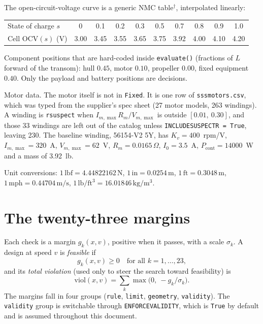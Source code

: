 \documentclass[11pt,a4paper]{article}
\renewcommand{\_}{\textunderscore\allowbreak}
\newcommand{\code}[1]{\texttt{#1}}
\begin{document}
The open-circuit-voltage curve is a generic NMC table$^\dagger$, interpolated linearly:
\begin{center}\small
\begin{tabular}{@{}l *{9}{c}@{}}
\toprule
State of charge $s$ & 0 & 0.1 & 0.2 & 0.3 & 0.5 & 0.7 & 0.8 & 0.9 & 1.0 \\
Cell $\mathrm{OCV}(s)$ (V) & 3.00 & 3.45 & 3.55 & 3.65 & 3.75 & 3.92 & 4.00 & 4.10 & 4.20 \\
\bottomrule
\end{tabular}
\end{center}

Component positions that are hard-coded inside \code{evaluate()} (fractions of $L$ forward of the transom):
hull $0.45$, motor $0.10$, propeller $0.00$, fixed equipment $0.40$. Only the payload and battery positions are decisions.

Motor data. The motor itself is not in \code{Fixed}. It is one row of \code{sss\_motors.csv}, which was typed from the supplier's spec sheet (27 motor models, 263 windings). A winding is \code{r\_suspect} when $I_{m,\max}R_m/V_{m,\max}$ is outside $[0.01,\ 0.30]$, and those 33 windings are left out of the catalog unless \code{INCLUDE\_SUSPECT\_R = True}, leaving 230. The baseline winding, 56154-V2 5Y, has $K_v=400$~rpm/V, $I_{m,\max}=320$~A, $V_{m,\max}=62$~V, $R_m=0.0165\,\Omega$, $I_0=3.5$~A, $P_{\mathrm{cont}}=14000$~W and a mass of 3.92~lb.

Unit conversions: $1\,\mathrm{lbf}=4.44822162\,\mathrm N$, $1\,\mathrm{in}=0.0254\,\mathrm m$,
$1\,\mathrm{ft}=0.3048\,\mathrm m$, $1\,\mathrm{mph}=0.44704\,\mathrm{m/s}$, $1\,\mathrm{lb/ft^3}=16.01846\,\mathrm{kg/m^3}$.


\section{The twenty-three margins}
\label{sec:constraints}

Each check is a margin $g_k(x,v)$, positive when it passes, with a scale $\sigma_k$. A design at speed $v$ is
\emph{feasible} if
\begin{equation}
  g_k(x,v) \ge 0 \quad \text{for all } k = 1,\dots,23,
  \label{eq:feasible}
\end{equation}
and its \emph{total violation} (used only to steer the search toward feasibility) is
\begin{equation}
  \mathrm{viol}(x,v) = \sum_k \max\!\bigl(0,\ -g_k/\sigma_k\bigr).
  \label{eq:violation}
\end{equation}
The margins fall in four groups (\code{rule}, \code{limit}, \code{geometry}, \code{validity}). The \code{validity}
group is switchable through \code{ENFORCE\_VALIDITY}, which is \code{True} by default and is assumed throughout this document.
\end{document}
